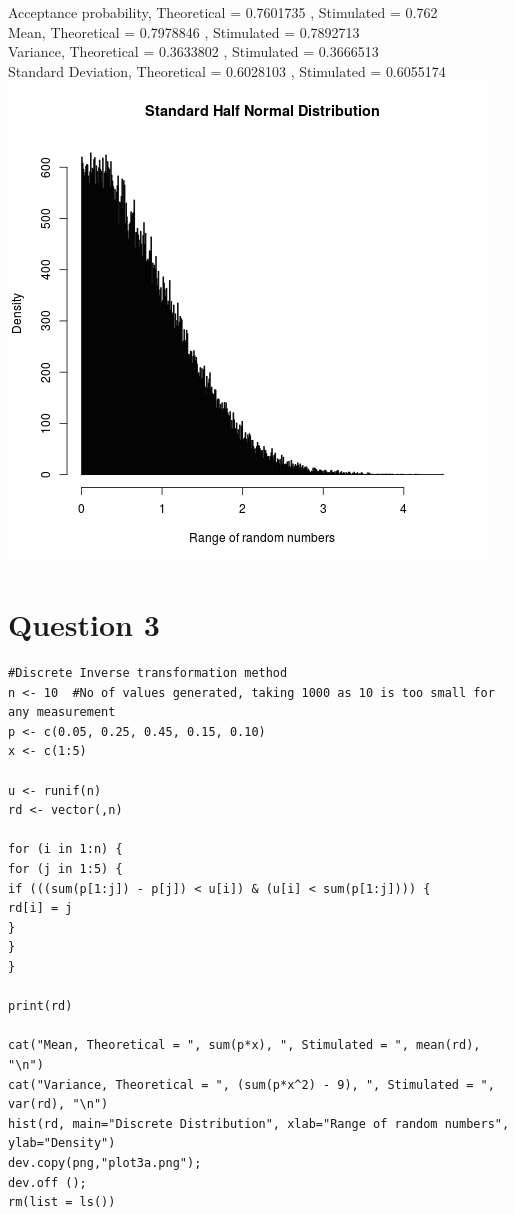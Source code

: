 \documentclass{article}
\begin{document}
Acceptance probability, Theoretical =  0.7601735 , Stimulated =  0.762 \\
Mean, Theoretical =  0.7978846 , Stimulated =  0.7892713 \\
Variance, Theoretical =  0.3633802 , Stimulated =  0.3666513 \\
Standard Deviation, Theoretical =  0.6028103 , Stimulated =  0.6055174 \\
\includegraphics{"plot2"}
\pagebreak

\section{Question 3}


\begin{lstlisting}
#Discrete Inverse transformation method
n <- 10	 #No of values generated, taking 1000 as 10 is too small for any measurement
p <- c(0.05, 0.25, 0.45, 0.15, 0.10)
x <- c(1:5)

u <- runif(n)
rd <- vector(,n)

for (i in 1:n) {
for (j in 1:5) {
if (((sum(p[1:j]) - p[j]) < u[i]) & (u[i] < sum(p[1:j]))) {
rd[i] = j
}
}
}

print(rd)

cat("Mean, Theoretical = ", sum(p*x), ", Stimulated = ", mean(rd), "\n")
cat("Variance, Theoretical = ", (sum(p*x^2) - 9), ", Stimulated = ", var(rd), "\n")
hist(rd, main="Discrete Distribution", xlab="Range of random numbers", ylab="Density")
dev.copy(png,"plot3a.png");
dev.off ();
rm(list = ls())
\end{lstlisting}
\end{document}
